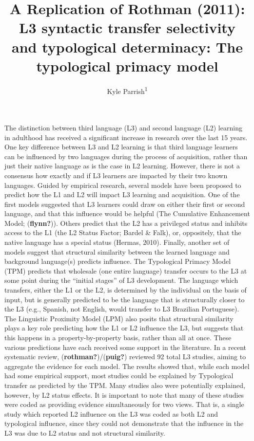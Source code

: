 \documentclass[
  man]{apa6}
\title{A Replication of Rothman (2011): L3 syntactic transfer selectivity and typological determinacy: The typological primacy model}
\author{Kyle Parrish\textsuperscript{1}}
\date{}
\affiliation{\vspace{0.5cm}\textsuperscript{1} Rutgers University}
\begin{document}
\maketitle

The distinction between third language (L3) and second language (L2) learning in adulthood has received a significant increase in research over the last 15 years.
One key difference between L3 and L2 learning is that third language learners can be influenced by two languages during the process of acquisition, rather than just their native language as is the case in L2 learning.
However, there is not a consensus how exactly and if L3 learners are impacted by their two known languages.
Guided by empirical research, several models have been proposed to predict how the L1 and L2 will impact L3 learning and acquisition.
One of the first models suggested that L3 learners could draw on either their first or second language, and that this influence would be helpful (The Cumulative Enhancement Model; (\textbf{flynn?})).
Others predict that the L2 has a privileged status and inhibits access to the L1 (the L2 Status Factor; Bardel \& Falk), or, oppositely, that the native language has a special status (Hermas, 2010).
Finally, another set of models suggest that structural similarity between the learned language and background language(s) predicts influence.
The Typological Primacy Model (TPM) predicts that wholesale (one entire language) transfer occurs to the L3 at some point during the ``initial stages'' of L3 development.
The language which transfers, either the L1 or the L2, is determined by the individual on the basis of input, but is generally predicted to be the language that is structurally closer to the L3 (e.g., Spanish, not English, would transfer to L3 Brazilian Portuguese).
The Linguistic Proximity Model (LPM) also posits that structural similarity plays a key role predicting how the L1 or L2 influence the L3, but suggests that this happens in a property-by-property basis, rather than all at once.
These various predictions have each received some support in the literature. In a recent systematic review, (\textbf{rothman?})/(\textbf{puig?}) reviewed 92 total L3 studies, aiming to aggregate the evidence for each model.
The results showed that, while each model had some empirical support, most studies could be explained by Typological transfer as predicted by the TPM.
Many studies also were potentially explained, however, by L2 status effects.
It is important to note that many of these studies were coded as providing evidence simultaneously for two views.
That is, a single study which reported L2 influence on the L3 was coded as both L2 and typological influence, since they could not demonstrate that the influence in the L3 was due to L2 status and not structural similarity.
\end{document}

